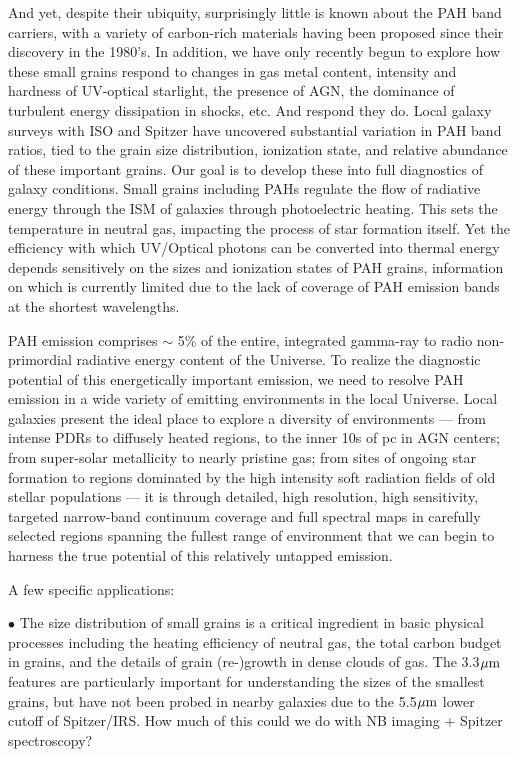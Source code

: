 \documentclass[12pt]{article}
\begin{document}
And yet, despite their ubiquity, surprisingly little is known about the PAH band carriers, with a variety of carbon-rich materials having been proposed since their discovery in the 1980’s.  In addition, we have only recently begun to explore how these small grains respond to changes in gas metal content, intensity and hardness of UV-optical starlight, the presence of AGN, the dominance of turbulent energy dissipation in shocks, etc.  And respond they do.  Local galaxy surveys with ISO and Spitzer have uncovered substantial variation in PAH band ratios, tied to the grain size distribution, ionization state, and relative abundance of these important grains.   Our goal is to develop these into full diagnostics of galaxy conditions.
Small grains including PAHs regulate the flow of radiative energy through the ISM of galaxies through photoelectric heating.  This sets the temperature in neutral gas, impacting the process of star formation itself.  Yet the efficiency with which UV/Optical photons can be converted into thermal energy depends sensitively on the sizes and ionization states of PAH grains, information on which is currently limited due to the lack of coverage of PAH emission bands at the shortest wavelengths.

PAH emission comprises $\sim$ 5\% of the entire, integrated gamma-ray to radio non-primordial radiative energy content of the Universe.  To realize the diagnostic potential of this energetically important emission, we need to resolve PAH emission in a wide variety of emitting environments in the local Universe.  Local galaxies present the ideal place to explore a diversity of environments — from intense PDRs to diffusely heated regions, to the inner 10s of pc in AGN centers; from super-solar metallicity to nearly pristine gas; from sites of ongoing star formation to regions dominated by the high intensity soft radiation fields of old stellar populations — it is through detailed, high resolution, high sensitivity, targeted narrow-band continuum coverage and full spectral maps in carefully selected regions spanning the fullest range of environment that we can begin to harness the true potential of this relatively untapped emission.

\noindent A few specific applications:

\noindent $\bullet$ The size distribution of small grains is a critical ingredient in basic physical processes including the heating efficiency of neutral gas, the total carbon budget in grains, and the details of grain (re-)growth in dense clouds of gas.  The 3.3$\hbox{$\mu$m}$ features are particularly important for understanding the sizes of the smallest grains, but have not been probed in nearby galaxies due to the 5.5$\hbox{$\mu$m}$ lower cutoff of Spitzer/IRS.  How much of this could we do with NB imaging + Spitzer spectroscopy?
\end{document}
